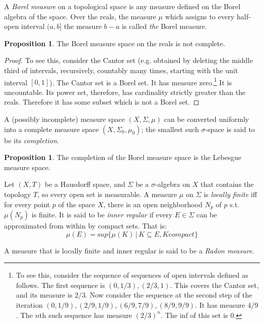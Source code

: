 \documentclass{article}
\newcommand{\alt}{\,|\,}
\theoremstyle{definition}
\newtheorem{proposition}[theorem]{Proposition}
\begin{document}
A {\em Borel measure} on a topological space is any measure defined on the Borel algebra of the space. Over the reals, the measure \(\mu\) which assigns to every half-open interval \((a,b]\) the measure \(b-a\) is called {\em the} Borel measure.

\begin{proposition}
The Borel measure space on the reals is not complete.  
\end{proposition}

\begin{proof}
To see this, consider the Cantor set (e.g.{} obtained by deleting the middle third of intervals, recursively, countably many times, starting with the unit interval \([0,1]\)). The Cantor set is a Borel set. It has measure zero.\footnote{To see this, consider the sequence of sequences of open intervals defined as follows. The first sequence is \((0,1/3),(2/3,1)\). This covers the Cantor set, and its measure is \(2/3\). Now consider the sequence at the second step of the iteration \((0,1/9),(2/9,1/9), (6/9,7/9),(8/9,9/9)\). It has measure \(4/9\). The \(n\)th such sequence has measure \((2/3)^n\). The inf of this set is \(0\).} It is uncountable. Its power set, therefore, has cardinality strictly greater than the reals. Therefore it has some subset which is not a Borel set.
\end{proof}

A (possibly incomplete) measure space \((X,\Sigma,\mu)\) can be converted uniformly into a complete measure space \((X,\Sigma_0,\mu_0)\); the smallest such \(\sigma\)-space is said to be its {\em completion}.

\begin{proposition}
  The completion of the Borel measure space is the Lebesgue measure space.  
\end{proposition}


Let \((X,T)\) be a Hausdorff space, and \(\Sigma\) be a \(\sigma\)-algebra on \(X\) that contains the topology \(T\), so every open set is measurable. A measure \(\mu\) on \(\Sigma\) is {\em locally finite} iff for every point \(p\) of the space \(X\), there is an open neighborhood \(N_p\) of \(p\) s.t. \(\mu(N_p)\) is finite. It is said to be {\em inner regular} if every \(E\in \Sigma\) can be approximated from within by compact sets. That is:
\[ \mu(E) = {\mathrm sup}\{\mu(K)\alt K \subseteq E, K {\mathrm compact}\}\]

A measure that is locally finite and inner regular is said to be a {\em Radon measure}.
\end{document}
